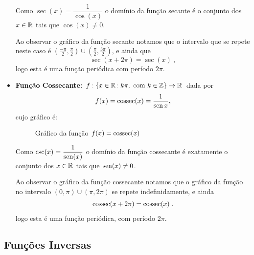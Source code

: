 \begin{itemize}
  Como $\sec(x)= \dfrac{1}{\cos (x)}$ o domínio da função secante é o conjunto dos $x \in \mathbb{R}$ tais que $\cos(x) \neq 0$.

  Ao observar o gráfico da função secante notamos que o intervalo que se repete neste caso é $(\frac{-\pi}{2}, \frac{\pi}{2}) \cup (\frac{\pi}{2}, \frac{3\pi}{2})$, e ainda que
\begin{equation*}
\sec(x + 2\pi)= \sec(x) \ ,
\end{equation*}
  logo esta é uma função periódica com período $2\pi$.
  
  \item \textbf{Função Cossecante:} $f: \{x\in\mathbb{R} \colon k\pi, \mbox{ com } k \in \mathbb{Z}\} \rightarrow \mathbb{R}$ dada por 
    \begin{equation*}
    f(x)= \operatorname{cossec}(x) = \frac{1}{\operatorname{sen} x},
    \end{equation*}
    cujo gráfico é:

  \begin{figure}[H]
  \centering
    \caption{Gráfico da função $f(x)= \operatorname{cossec}(x)$}
  \end{figure}

  Como $\csc(x)= \dfrac{1}{\operatorname{sen}(x)}$ o domínio da função cossecante é exatamente o conjunto dos $x \in \mathbb{R}$ tais que $\operatorname{sen}(x) \neq 0$.

  Ao observar o gráfico da função cossecante notamos que o gráfico da função no intervalo $(0, \pi) \cup (\pi, 2 \pi)$ se repete indefinidamente, e ainda
\begin{equation*}
\operatorname{cossec}(x + 2\pi)= \operatorname{cossec}(x) \ , 
\end{equation*}
  logo esta é uma função periódica, com período $2\pi$.

\end{itemize}
    
  \subsection{Funções Inversas}

